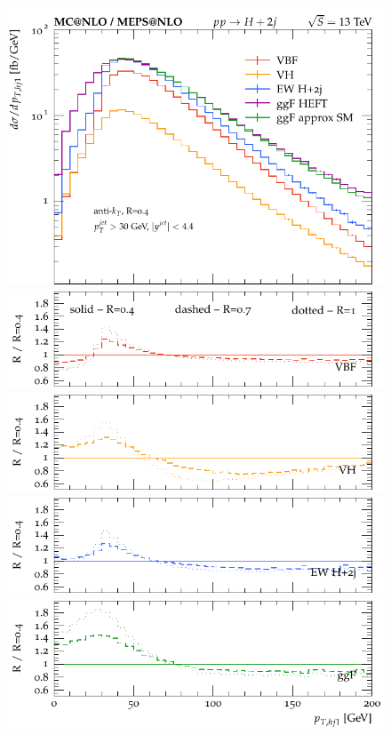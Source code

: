\documentclass[10pt,prd,fleqn,superscriptaddress,notitlepage,nofootinbib,preprintnumbers,nobalancelastpage]{revtex4-1}
\begin{document}
\begin{figure}[p]
\begin{minipage}{.295\textwidth}
  \end{minipage}\hskip 1cm
  \begin{minipage}{.295\textwidth}
    \includegraphics[width=\textwidth]{figures/channels/pthj1.pdf}
    \includegraphics[width=\textwidth]{figures/channels/pthj1_rVBF.pdf}
    \includegraphics[width=\textwidth]{figures/channels/pthj1_rVH.pdf}
    \includegraphics[width=\textwidth]{figures/channels/pthj1_rHJJ.pdf}
    \includegraphics[width=\textwidth]{figures/channels/pthj1_rGGH.pdf}

\end{minipage}
\end{figure}
\end{document}
